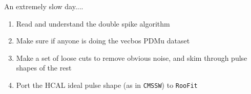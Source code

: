 
An extremely slow day....


\begin{enumerate}
\item Read and understand the double spike algorithm
\item Make sure if anyone is doing the vecbos PDMu dataset
\item Make a set of loose cuts to remove obvious noise, and skim through pulse shapes of the rest
\item Port the HCAL ideal pulse shape (as in \texttt{CMSSW}) to \texttt{RooFit}
\end{enumerate}



